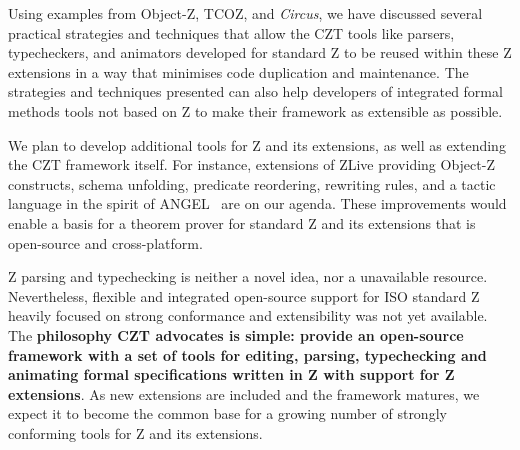 \documentclass{llncs}
\newcommand{\Circus}{{\sf\slshape Circus}}
\begin{document}
  Using examples from Object-Z, TCOZ, and \Circus, we have discussed
  several practical strategies and techniques that allow the CZT tools
  like parsers, typecheckers, and animators developed for standard Z
  to be reused within these Z extensions in a way that minimises code
  duplication and maintenance.  The strategies and techniques
  presented can also help developers of integrated formal methods
  tools not based on Z to make their framework as extensible as
  possible.

  We plan to develop additional tools for Z and its extensions,
  as well as extending the CZT framework itself.
  For instance, extensions of ZLive providing Object-Z constructs,
  schema unfolding, predicate reordering, rewriting rules, and
  a tactic language in the spirit of ANGEL~\cite{z.others:angel} are
  on our agenda. These improvements would enable a basis for a theorem
  prover for standard Z and its extensions that is open-source and
  cross-platform.

  Z parsing and typechecking is neither a novel idea, nor a
  unavailable resource.  Nevertheless, flexible and integrated
  open-source support for ISO standard Z heavily focused
  on strong conformance and extensibility was not yet available.
  The \textbf{philosophy CZT advocates is simple: provide an
  open-source framework with a set of tools for editing, parsing,
  typechecking and animating formal specifications written in Z with
  support for Z extensions}.  As new extensions are included and the
  framework matures, we expect it to become the common base for a
  growing number of strongly conforming tools for Z and its extensions.



\end{document}
